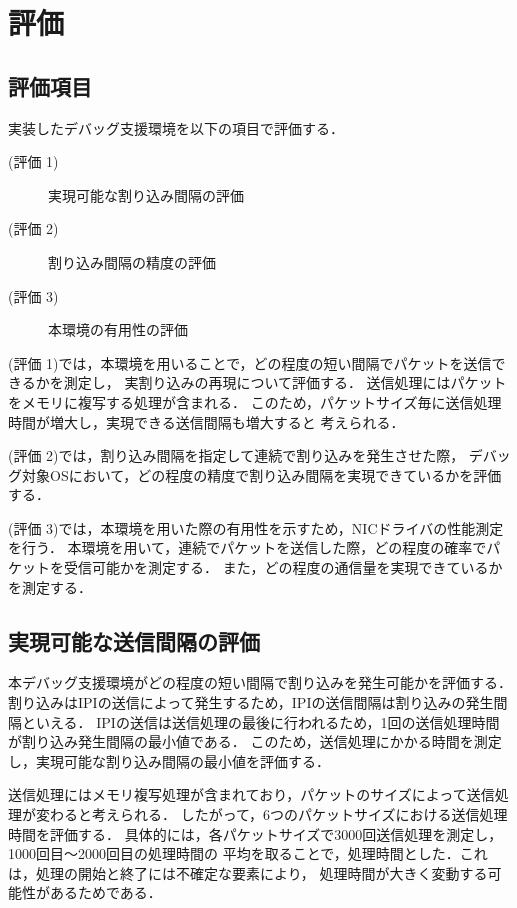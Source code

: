 \documentclass[submit,techreq,noauthor,dvipdfmx]{ipsj}
\begin{document}
\section{評価}\label{chap:evaluation}

\subsection{評価項目}\label{sec:item-of-evaluation}

実装したデバッグ支援環境を以下の項目で評価する．
\begin{description}
    \item[(評価 1)]実現可能な割り込み間隔の評価
    \item[(評価 2)]割り込み間隔の精度の評価
    \item[(評価 3)]本環境の有用性の評価
\end{description}

(評価 1)では，本環境を用いることで，どの程度の短い間隔でパケットを送信できるかを測定し，
実割り込みの再現について評価する．
送信処理にはパケットをメモリに複写する処理が含まれる．
このため，パケットサイズ毎に送信処理時間が増大し，実現できる送信間隔も増大すると
考えられる．

(評価 2)では，割り込み間隔を指定して連続で割り込みを発生させた際，
デバッグ対象OSにおいて，どの程度の精度で割り込み間隔を実現できているかを評価する．

(評価 3)では，本環境を用いた際の有用性を示すため，NICドライバの性能測定を行う．
本環境を用いて，連続でパケットを送信した際，どの程度の確率でパケットを受信可能かを測定する．
また，どの程度の通信量を実現できているかを測定する．

\subsection{実現可能な送信間隔の評価}\label{sec:interval}

本デバッグ支援環境がどの程度の短い間隔で割り込みを発生可能かを評価する．
割り込みはIPIの送信によって発生するため，IPIの送信間隔は割り込みの発生間隔といえる．
IPIの送信は送信処理の最後に行われるため，1回の送信処理時間が割り込み発生間隔の最小値である．
このため，送信処理にかかる時間を測定し，実現可能な割り込み間隔の最小値を評価する．

送信処理にはメモリ複写処理が含まれており，パケットのサイズによって送信処理が変わると考えられる．
したがって，6つのパケットサイズにおける送信処理時間を評価する．
具体的には，各パケットサイズで3000回送信処理を測定し，1000回目〜2000回目の処理時間の
平均を取ることで，処理時間とした．これは，処理の開始と終了には不確定な要素により，
処理時間が大きく変動する可能性があるためである．
\end{document}
